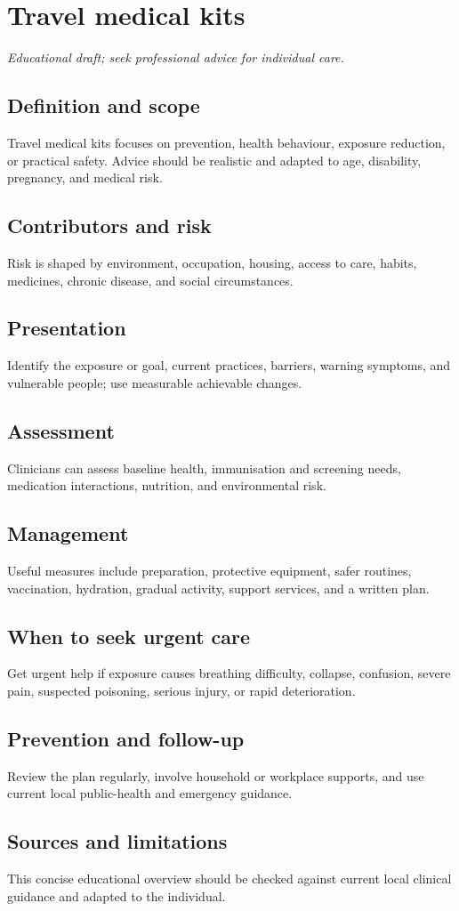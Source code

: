 \chapter{Travel medical kits}
\medskip
\noindent\textit{Educational draft; seek professional advice for individual care.}

\section*{Definition and scope}
Travel medical kits focuses on prevention, health behaviour, exposure reduction, or practical safety. Advice should be realistic and adapted to age, disability, pregnancy, and medical risk.

\section*{Contributors and risk}
Risk is shaped by environment, occupation, housing, access to care, habits, medicines, chronic disease, and social circumstances.

\section*{Presentation}
Identify the exposure or goal, current practices, barriers, warning symptoms, and vulnerable people; use measurable achievable changes.

\section*{Assessment}
Clinicians can assess baseline health, immunisation and screening needs, medication interactions, nutrition, and environmental risk.

\section*{Management}
Useful measures include preparation, protective equipment, safer routines, vaccination, hydration, gradual activity, support services, and a written plan.

\section*{When to seek urgent care}
Get urgent help if exposure causes breathing difficulty, collapse, confusion, severe pain, suspected poisoning, serious injury, or rapid deterioration.

\section*{Prevention and follow-up}
Review the plan regularly, involve household or workplace supports, and use current local public-health and emergency guidance.

\section*{Sources and limitations}
This concise educational overview should be checked against current local clinical guidance and adapted to the individual.
